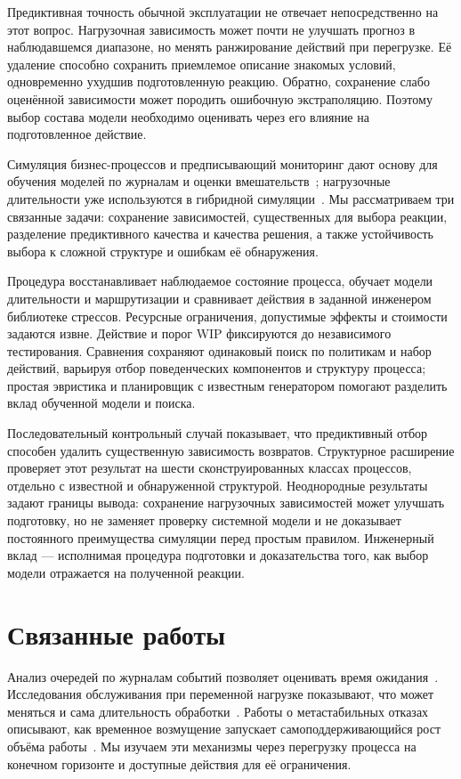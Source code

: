 Предиктивная точность обычной эксплуатации не отвечает непосредственно на этот вопрос. Нагрузочная зависимость может почти не улучшать прогноз в наблюдавшемся диапазоне, но менять ранжирование действий при перегрузке. Её удаление способно сохранить приемлемое описание знакомых условий, одновременно ухудшив подготовленную реакцию. Обратно, сохранение слабо оценённой зависимости может породить ошибочную экстраполяцию. Поэтому выбор состава модели необходимо оценивать через его влияние на подготовленное действие.

Симуляция бизнес-процессов и предписывающий мониторинг дают основу для обучения моделей по журналам и оценки вмешательств~\cite{simod,alarms,hybridpolicy,rlpolicies}; нагрузочные длительности уже используются в гибридной симуляции~\cite{deepsimulator,hybridpolicy}. Мы рассматриваем три связанные задачи: сохранение зависимостей, существенных для выбора реакции, разделение предиктивного качества и качества решения, а также устойчивость выбора к сложной структуре и ошибкам её обнаружения.

Процедура восстанавливает наблюдаемое состояние процесса, обучает модели длительности и маршрутизации и сравнивает действия в заданной инженером библиотеке стрессов. Ресурсные ограничения, допустимые эффекты и стоимости задаются извне. Действие и порог WIP фиксируются до независимого тестирования. Сравнения сохраняют одинаковый поиск по политикам и набор действий, варьируя отбор поведенческих компонентов и структуру процесса; простая эвристика и планировщик с известным генератором помогают разделить вклад обученной модели и поиска.

Последовательный контрольный случай показывает, что предиктивный отбор способен удалить существенную зависимость возвратов. Структурное расширение проверяет этот результат на шести сконструированных классах процессов, отдельно с известной и обнаруженной структурой. Неоднородные результаты задают границы вывода: сохранение нагрузочных зависимостей может улучшать подготовку, но не заменяет проверку системной модели и не доказывает постоянного преимущества симуляции перед простым правилом. Инженерный вклад — исполнимая процедура подготовки и доказательства того, как выбор модели отражается на полученной реакции.

\section{Связанные работы}
Анализ очередей по журналам событий позволяет оценивать время ожидания~\cite{queue}. Исследования обслуживания при переменной нагрузке показывают, что может меняться и сама длительность обработки~\cite{load}. Работы о метастабильных отказах описывают, как временное возмущение запускает самоподдерживающийся рост объёма работы~\cite{metastable}. Мы изучаем эти механизмы через перегрузку процесса на конечном горизонте и доступные действия для её ограничения.

